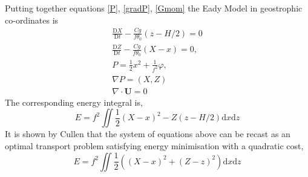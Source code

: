 Putting together equations \ref{P}, \ref{gradP}, \ref{Gmom} the Eady Model in geostrophic co-ordinates is 
\begin{equation}
	\begin{aligned}
		\frac{\mathrm{D}X}{\mathrm{D}t} -\frac{Cg}{f\theta _0}\left(z-H/2\right) = 0 \\
		\frac{\mathrm{D}Z}{\mathrm{D}t} - \frac{Cg}{f\theta_0}\left(X - x\right) = 0,\\
		P = \frac{1}{2}x^2 + \frac{1}{f^2}\varphi,\\
		\nabla P = (X,Z)\\
		\nabla \cdot \bm{U} = 0
	\end{aligned}
\label{EadyGC}
\end{equation}
The corresponding energy integral is,
\begin{equation}
E = f^2 \iint \frac{1}{2}\left(X-x\right)^2 - Z\left(z - H/2\right)\textrm{d}x\textrm{d}z
\end{equation}
It is shown by Cullen \cite{Cullen2006a} that the system of equations above can be recast as an optimal transport problem satisfying energy minimisation with a quadratic cost,
\begin{equation}
E = f^2 \iint \frac{1}{2}\left(\left(X-x\right)^2 + \left(Z - z\right)^2\right)\textrm{d}x\textrm{d}z
\end{equation}
